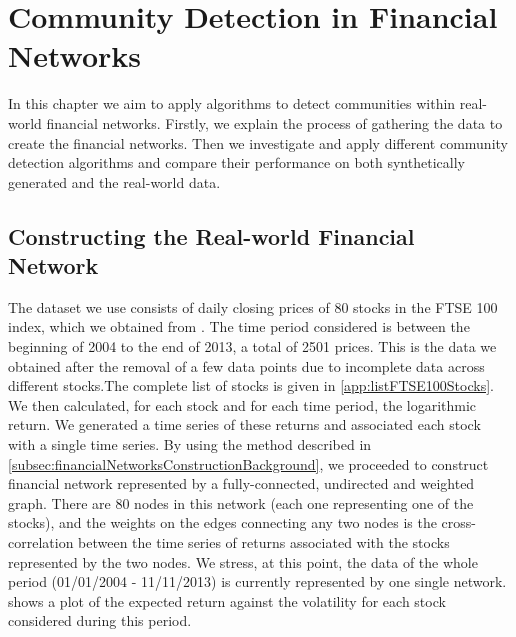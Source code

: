 
\chapter{Community Detection in Financial Networks}

\label{cha:communityDetectionFinancialNetworks}


In this chapter we aim to apply algorithms to detect communities within real-world financial networks.
Firstly, we explain the process of gathering the data to create the financial networks.
Then we investigate and apply different community detection algorithms and compare their performance on both synthetically generated and the real-world data.


\section{Constructing the Real-world Financial Network}
\label{sec:realWorldFinancialNetwork}

The dataset we use consists of daily closing prices of 80 stocks in the FTSE 100 index, which we obtained from \cite{YahFi}.
The time period considered is between the beginning of 2004 to the end of 2013, a total of 2501 prices. 
This is the data we obtained after the removal of a few data points due to incomplete data across different stocks.The complete list of stocks is given in \cref{app:listFTSE100Stocks}.
We then calculated, for each stock and for each time period, the logarithmic return. We generated a time series of these returns and associated each stock with a single time series.
By using the method described in \cref{subsec:financialNetworksConstructionBackground}, we proceeded to construct financial network represented by a fully-connected, undirected and weighted graph. There are 80 nodes in this network (each one representing one of the stocks), and the weights on the edges connecting any two nodes is the cross-correlation between the time series of returns associated with the stocks represented by the two nodes.
We stress, at this point, the data of the whole period (01/01/2004 - 11/11/2013) is currently represented by one single network.
 shows a plot of the expected return against the volatility for each stock considered during this period.

